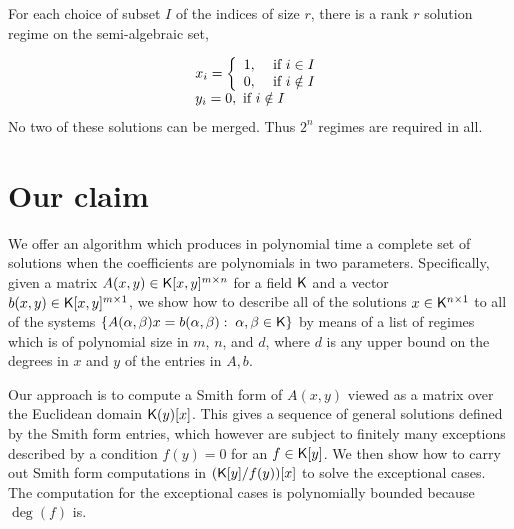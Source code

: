 For each choice of subset $I$ of the indices of size $r$,
there is a rank $r$ solution regime on 
the semi-algebraic set, 

\[\begin{array}{l}
x_{i} = \left\{
\begin{array}{ll} 1, & ~\mbox{if}~ i \in I \\ 0, & ~\mbox{if}~ i \notin I\end{array}\right.\\
y_{i} = 0,  ~\mbox{if}~ i \notin I 
\end{array}\] 
No two of these solutions can be merged.  Thus $2^n$ regimes are required in all.

\section{Our claim}

We offer an algorithm which produces in polynomial time a complete set
of solutions when the coefficients are polynomials in two parameters.
Specifically, given a matrix $A(x,y)\in{\mathsf K}[x,y]^{m\times n}$ for a field ${\mathsf K}$
and a vector $b(x,y)\in{\mathsf K}[x,y]^{m\times 1}$, we show how to describe all of
the solutions $x \in {\mathsf K}^{n\times 1}$ to all of the systems
$\{ A(\alpha, \beta)x = b(\alpha, \beta):\; \alpha,\beta\in{\mathsf K}\}$ 
by means of a list of regimes which is of polynomial size in $m$, $n$,
and $d$, where $d$ is any upper bound on the degrees in $x$ and $y$ of the entries in 
$A, b$.
%
  
Our approach is to compute a Smith form of $A(x,y)$ viewed as a matrix
over the Euclidean domain ${\mathsf K}(y)[x]$.  This gives a sequence of
general solutions defined by the Smith form entries, which however are
subject to finitely many exceptions described by a condition 
$f(y) = 0$ for an $f\in{\mathsf K}[y]$.  We then show how to carry out Smith form
computations in $({\mathsf K}[y]/f(y))[x]$ to solve the exceptional cases.  
The computation for the exceptional cases is 
polynomially bounded because $\deg(f)$ is. 


